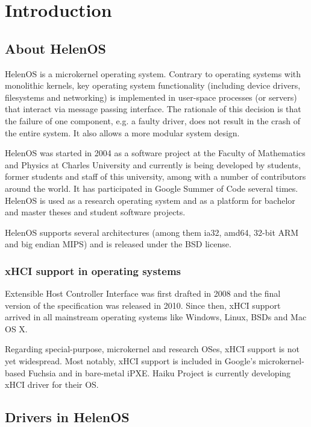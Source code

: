 \chapter{Introduction}

\section{About HelenOS}
HelenOS is a microkernel operating system. Contrary to operating systems with
monolithic kernels, key operating system functionality (including device
drivers, filesystems and networking) is implemented in user-space processes (or
servers) that interact via message passing interface. The rationale of this
decision is that the failure of one component, e.g. a faulty driver, does not
result in the crash of the entire system. It also allows a more modular system
design.

HelenOS was started in 2004 as a software project at the Faculty of Mathematics
and Physics at Charles University and currently is being developed by students,
former students and staff of this university, among with a number of
contributors around the world. It has participated in Google Summer of Code
several times. HelenOS is used as a research operating system and as a platform
for bachelor and master theses and student software projects.

HelenOS supports several architectures (among them ia32, amd64, 32-bit ARM and
big endian MIPS) and is released under the BSD license.

\subsection{xHCI support in operating systems}

Extensible Host Controller Interface was first drafted in 2008 and the final
version of the specification was released in 2010. Since then, xHCI support
arrived in all mainstream operating systems like Windows, Linux, BSDs and Mac
OS X.

Regarding special-purpose, microkernel and research OSes, xHCI support is not
yet widespread.  Most notably, xHCI support is included in Google's
microkernel-based Fuchsia and in bare-metal iPXE.  Haiku Project is currently
developing xHCI driver for their OS.

\section{Drivers in HelenOS}

